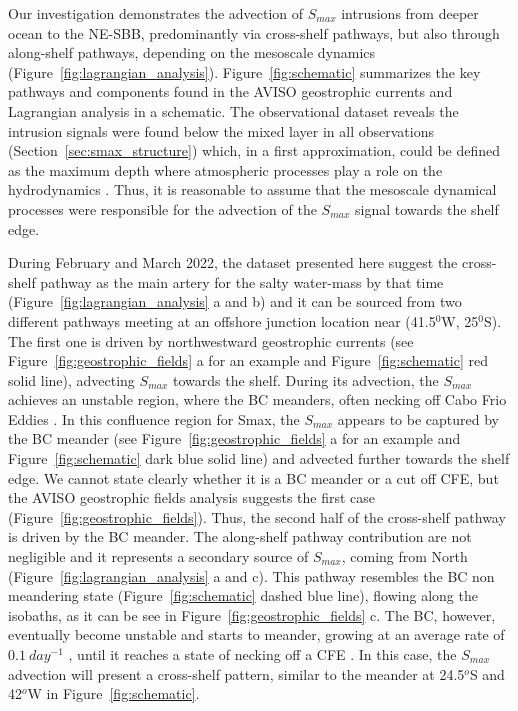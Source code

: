 \documentclass[draft]{agujournal2019}
\begin{document}
Our investigation demonstrates the advection of \textit{$S_{max}$} intrusions from deeper ocean to the NE-SBB, predominantly via cross-shelf pathways, but also through along-shelf pathways, depending on the mesoscale dynamics (Figure~\ref{fig:lagrangian_analysis}). Figure~\ref{fig:schematic} summarizes the key pathways and components found in the AVISO geostrophic currents and Lagrangian analysis in a schematic. The observational dataset reveals the intrusion signals were found below the mixed layer in all observations (Section~\ref{sec:smax_structure}) which, in a first approximation, could be defined as the maximum depth where atmospheric processes play a role on the hydrodynamics \cite{giunta2022ocean}. Thus, it is reasonable to assume that the mesoscale dynamical processes were responsible for the advection of the \textit{$S_{max}$} signal towards the shelf edge.

During February and March 2022, the dataset presented here suggest the cross-shelf pathway as the main artery for the salty water-mass by that time (Figure~\ref{fig:lagrangian_analysis} a and b) and it can be sourced from two different pathways meeting at an offshore junction location near (41.5$^0$W, 25$^0$S). The first one is driven by northwestward geostrophic currents (see Figure~\ref{fig:geostrophic_fields} a for an example and Figure~\ref{fig:schematic} red solid line), advecting \textit{$S_{max}$} towards the shelf. During its advection, the \textit{$S_{max}$} achieves an unstable region, where the BC meanders, often necking off Cabo Frio Eddies \cite<CFE, >{rocha2022,uchoa2023,silveira2023}. In this confluence region for Smax, the \textit{$S_{max}$} appears to be captured by the BC meander (see Figure~\ref{fig:geostrophic_fields} a for an example and Figure~\ref{fig:schematic} dark blue solid line) and advected further towards the shelf edge. We cannot state clearly whether it is a BC meander or a cut off CFE, but the AVISO geostrophic fields analysis suggests the first case (Figure~\ref{fig:geostrophic_fields}). Thus, the second half of the cross-shelf pathway is driven by the BC meander. The along-shelf pathway contribution are not negligible and it represents a secondary source of \textit{$S_{max}$}, coming from North (Figure~\ref{fig:lagrangian_analysis} a and c). This pathway resembles the BC non meandering state (Figure~\ref{fig:schematic} dashed blue line), flowing along the isobaths, as it can be see in Figure~\ref{fig:geostrophic_fields} c. The BC, however, eventually become unstable and starts to meander, growing at an average rate of $0.1\ day^{-1}$ \cite<see Figure 3 in>{silveira2023}, until it reaches a state of necking off a CFE \cite{uchoa2023}. In this case, the \textit{$S_{max}$} advection will present a cross-shelf pattern, similar to the meander at 24.5$^o$S and 42$^o$W in Figure~\ref{fig:schematic}. 
\end{document}

